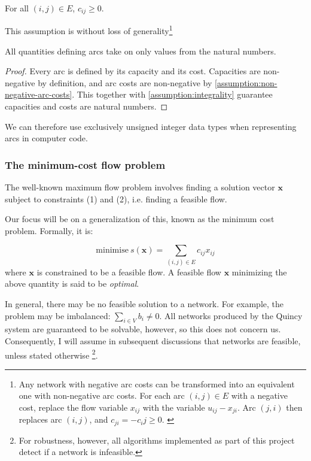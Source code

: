 \begin{assumption} \label{assumption:non-negative-arc-costs}
For all $(i,j) \in E$, $c_{ij} \geq 0$.\end{assumption}

This assumption is without loss of generality\footnote{Any network with negative arc costs can be transformed into an equivalent one with non-negative arc costs. For each arc $(i,j) \in E$ with a negative cost, replace the flow variable $x_{ij}$ with the variable $u_{ij} - x_{ji}$. Arc $(j,i)$ then replaces arc $(i,j)$, and $c_{ji} = -c_ij \geq 0$. \cite[p.~48]{Ahuja:1993}} \\

\begin{cor}All quantities defining arcs take on only values from the natural numbers.\footnotemark
{}
\end{cor}
\begin{proof}
Every arc is defined by its capacity and its cost. Capacities are non-negative by definition, and arc costs are non-negative by \cref{assumption:non-negative-arc-costs}. This together with \cref{assumption:integrality} guarantee capacities and costs are natural numbers.
\end{proof}

We can therefore use exclusively unsigned integer data types when representing arcs in computer code.

\subsubsection{The minimum-cost flow problem} \label{sec:prep-flow-mcf}

The well-known maximum flow problem involves finding a solution vector
$\mathbf{x}$ subject to constraints (1) and (2), i.e. finding a feasible
flow.

Our focus will be on a generalization of this, known as the minimum
cost problem. Formally, it is:

\begin{equation}
\mbox{minimise}\ s(\mathbf{x})=\sum_{(i,j)\in E}c_{ij}x_{ij}
\end{equation}
where $\mathbf{x}$ is constrained to be a feasible flow. A feasible
flow $\mathbf{x}$ minimizing the above quantity is said to be \emph{optimal}.

In general, there may be no feasible solution to a network. For example,
the problem may be imbalanced: $\sum_{i\in V}b_{i}\neq0$. All networks
produced by the Quincy system are guaranteed to be solvable, however,
so this does not concern us. Consequently, I will assume in subsequent
discussions that networks are feasible, unless stated otherwise%
\footnote{For robustness, however, all algorithms implemented as part of this project detect if a network is infeasible.}.

